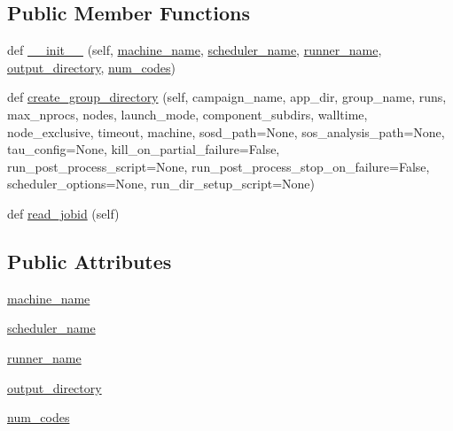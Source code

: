 \subsection*{Public Member Functions}
\begin{DoxyCompactItemize}
\item 
def \hyperlink{classcodar_1_1cheetah_1_1launchers_1_1_launcher_a646b70e47e85def77f4ba1dbfbeb5b34}{\+\_\+\+\_\+init\+\_\+\+\_\+} (self, \hyperlink{classcodar_1_1cheetah_1_1launchers_1_1_launcher_a86b1aeb4e2269748abe1a8bed98202f6}{machine\+\_\+name}, \hyperlink{classcodar_1_1cheetah_1_1launchers_1_1_launcher_aded443c0ede567093c5104eb325b87bc}{scheduler\+\_\+name}, \hyperlink{classcodar_1_1cheetah_1_1launchers_1_1_launcher_a70843b9eef7ddfd447dd31344a8ac416}{runner\+\_\+name}, \hyperlink{classcodar_1_1cheetah_1_1launchers_1_1_launcher_a670353f0a0273fde7c77e298850210dc}{output\+\_\+directory}, \hyperlink{classcodar_1_1cheetah_1_1launchers_1_1_launcher_a1e3bb2f0be7b5093daf6a6391d386a09}{num\+\_\+codes})
\item 
def \hyperlink{classcodar_1_1cheetah_1_1launchers_1_1_launcher_a961dc12bab6b346c28372995b9873e46}{create\+\_\+group\+\_\+directory} (self, campaign\+\_\+name, app\+\_\+dir, group\+\_\+name, runs, max\+\_\+nprocs, nodes, launch\+\_\+mode, component\+\_\+subdirs, walltime, node\+\_\+exclusive, timeout, machine, sosd\+\_\+path=None, sos\+\_\+analysis\+\_\+path=None, tau\+\_\+config=None, kill\+\_\+on\+\_\+partial\+\_\+failure=False, run\+\_\+post\+\_\+process\+\_\+script=None, run\+\_\+post\+\_\+process\+\_\+stop\+\_\+on\+\_\+failure=False, scheduler\+\_\+options=None, run\+\_\+dir\+\_\+setup\+\_\+script=None)
\item 
def \hyperlink{classcodar_1_1cheetah_1_1launchers_1_1_launcher_af6f838444c55859d67a1ad60fed1198e}{read\+\_\+jobid} (self)
\end{DoxyCompactItemize}
\subsection*{Public Attributes}
\begin{DoxyCompactItemize}
\item 
\hyperlink{classcodar_1_1cheetah_1_1launchers_1_1_launcher_a86b1aeb4e2269748abe1a8bed98202f6}{machine\+\_\+name}
\item 
\hyperlink{classcodar_1_1cheetah_1_1launchers_1_1_launcher_aded443c0ede567093c5104eb325b87bc}{scheduler\+\_\+name}
\item 
\hyperlink{classcodar_1_1cheetah_1_1launchers_1_1_launcher_a70843b9eef7ddfd447dd31344a8ac416}{runner\+\_\+name}
\item 
\hyperlink{classcodar_1_1cheetah_1_1launchers_1_1_launcher_a670353f0a0273fde7c77e298850210dc}{output\+\_\+directory}
\item 
\hyperlink{classcodar_1_1cheetah_1_1launchers_1_1_launcher_a1e3bb2f0be7b5093daf6a6391d386a09}{num\+\_\+codes}
\end{DoxyCompactItemize}
